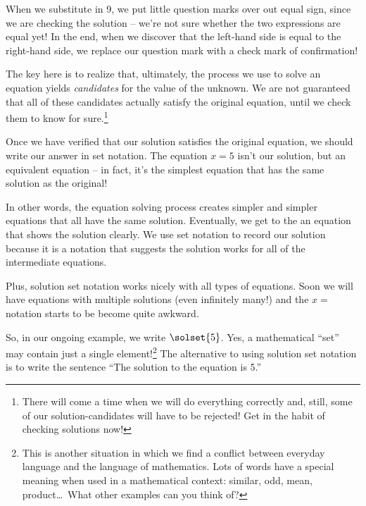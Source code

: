 
When we substitute in 9, we put little question marks over out equal sign, since we are checking the solution -- we're not sure whether the two expressions are equal yet! In the end, when we discover that the left-hand side is equal to the right-hand side, we replace our question mark with a check mark of confirmation!

The key here is to realize that, ultimately, the process we use to solve an equation yields \textit{candidates} for the value of the unknown. We are not guaranteed that all of these candidates actually satisfy the original equation, until we check them to know for sure.\footnote{There will come a time when we will do everything correctly and, still, some of our solution-candidates will have to be rejected! Get in the habit of checking solutions now!}

Once we have verified that our solution satisfies the original equation, we should write our answer in set notation. The equation $x=5$ isn't our solution, but an equivalent equation -- in fact, it's the simplest equation that has the same solution as the original!

In other words, the equation solving process creates simpler and simpler equations that all have the same solution. Eventually, we get to the an equation that shows the solution clearly. We use set notation to record our solution because it is a notation that suggests the solution works for all of the intermediate equations.

Plus, solution set notation works nicely with all types of equations. Soon we will have equations with multiple solutions (even infinitely many!) and the $x=$ notation starts to be become quite awkward.

So, in our ongoing example, we write $\solset{5}$. Yes, a mathematical ``set'' may contain just a single element!\footnote{This is another situation in which we find a conflict between everyday language and the language of mathematics. Lots of words have a special meaning when used in a mathematical context: similar, odd, mean, product\ldots\ What other examples can you think of?} The alternative to using solution set notation is to write the sentence ``The solution to the equation is 5.''


